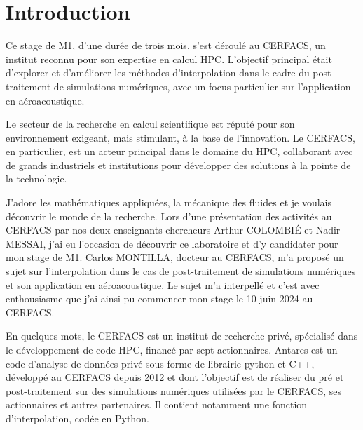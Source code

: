 \section*{Introduction}

Ce stage de M1, d'une durée de trois mois, s'est déroulé au CERFACS, un institut reconnu pour son expertise en calcul \ac{HPC}. L'objectif principal était d'explorer et d'améliorer les méthodes d'interpolation dans le cadre du post-traitement de simulations numériques, avec un focus particulier sur l'application en aéroacoustique.

Le secteur de la recherche en calcul scientifique est réputé pour son environnement exigeant, mais stimulant, à la base de l'innovation. Le CERFACS, en particulier, est un acteur principal dans le domaine du HPC, collaborant avec de grands industriels et institutions pour développer des solutions à la pointe de la technologie.





J'adore les mathématiques appliquées, la mécanique des fluides et je voulais découvrir le monde de la recherche. Lors d'une présentation des activités au \ac{CERFACS} par nos deux enseignants chercheurs Arthur COLOMBIÉ et Nadir MESSAI, j'ai eu l'occasion de découvrir ce laboratoire et d'y candidater pour mon stage de M1. Carlos MONTILLA, docteur au CERFACS, m'a proposé un sujet sur l'interpolation dans le cas de post-traitement de simulations numériques et son application en aéroacoustique. Le sujet m'a interpellé et c'est avec enthousiasme que j'ai ainsi pu commencer mon stage le 10 juin 2024 au CERFACS.

En quelques mots, le CERFACS est un institut de recherche privé, spécialisé dans le développement de code HPC, financé par sept actionnaires. %
Antares \cite{antares} est un code d’analyse de données privé sous forme de librairie python et C++, développé au CERFACS depuis 2012 et dont l'objectif est de réaliser du pré et post-traitement sur des simulations numériques utilisées par le CERFACS, ses actionnaires et autres partenaires.
Il contient notamment une fonction d'interpolation, codée en Python.

